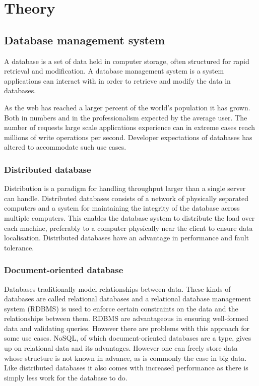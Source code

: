 \chapter{Theory}
\label{chap:theory}
\section{Database management system}

A database is a set of data held in computer storage, often structured for rapid retrieval and modification. A database management system is a system applications can interact with in order to retrieve and modify the data in databases.

As the web has reached a larger percent of the world's population it has grown. Both in numbers and in the professionalism expected by the average user. The number of requests large scale applications experience can in extreme cases reach millions of write operations per second\cite[p.~43]{nosql-ntnu}. Developer expectations of databases has altered to accommodate such use cases. 

\subsection{Distributed database}

Distribution is a paradigm for handling throughput larger than a single server can handle. Distributed databases consists of a network of physically separated computers and a system for maintaining the integrity of the database across multiple computers\cite[p.~4]{ddms}. This enables the database system to distribute the load over each machine, preferably to a computer physically near the client to ensure data localisation. Distributed databases have an advantage in performance and fault tolerance\cite[pp.~12--15]{ddms}.

\subsection{Document-oriented database}

Databases traditionally model relationships between data. These kinds of databases are called relational databases and a relational database management system (RDBMS) is used to enforce certain constraints on the data and the relationships between them. RDBMS are advantageous in ensuring well-formed data and validating queries. However there are problems with this approach for some use cases. NoSQL, of which document-oriented databases are a type, gives up on relational data and its advantages. However one can freely store data whose structure is not known in advance, as is commonly the case in big data. Like distributed databases it also comes with increased performance\cite{cmp-nosql} as there is simply less work for the database to do.

